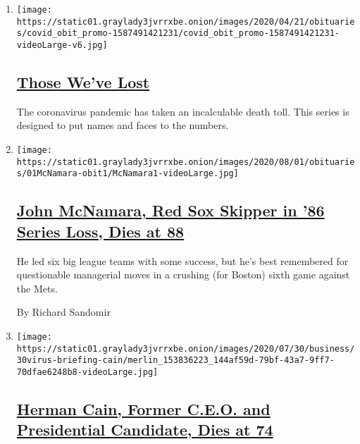\begin{enumerate}
\def\labelenumi{\arabic{enumi}.}
\item
  \texttt{[image: https://static01.graylady3jvrrxbe.onion/images/2020/04/21/obituaries/covid\_obit\_promo-1587491421231/covid\_obit\_promo-1587491421231-videoLarge-v6.jpg]}

  \hypertarget{those-weve-lost}{%
  \subsection{\texorpdfstring{\href{https://www.nytimes3xbfgragh.onion/interactive/2020/obituaries/people-died-coronavirus-obituaries.html}{Those
  We've Lost}}{Those We've Lost}}\label{those-weve-lost}}

  The coronavirus pandemic has taken an incalculable death toll. This
  series is designed to put names and faces to the numbers.
\item
  \texttt{[image: https://static01.graylady3jvrrxbe.onion/images/2020/08/01/obituaries/01McNamara-obit1/McNamara1-videoLarge.jpg]}

  \hypertarget{john-mcnamara-red-sox-skipper-in-86-series-loss-dies-at-88}{%
  \subsection{\texorpdfstring{\href{/2020/07/31/sports/baseball/john-mcnamara-dead.html}{John
  McNamara, Red Sox Skipper in '86 Series Loss, Dies at
  88}}{John McNamara, Red Sox Skipper in '86 Series Loss, Dies at 88}}\label{john-mcnamara-red-sox-skipper-in-86-series-loss-dies-at-88}}

  He led six big league teams with some success, but he's best
  remembered for questionable managerial moves in a crushing (for
  Boston) sixth game against the Mets.

  By Richard Sandomir
\item
  \texttt{[image: https://static01.graylady3jvrrxbe.onion/images/2020/07/30/business/30virus-briefing-cain/merlin\_153836223\_144af59d-79bf-43a7-9ff7-70dfae6248b8-videoLarge.jpg]}

  \hypertarget{herman-cain-former-ceo-and-presidential-candidate-dies-at-74}{%
  \subsection{\texorpdfstring{\href{/2020/07/30/us/politics/herman-cain-dead.html}{Herman
  Cain, Former C.E.O. and Presidential Candidate, Dies at
  74}}{Herman Cain, Former C.E.O. and Presidential Candidate, Dies at 74}}\label{herman-cain-former-ceo-and-presidential-candidate-dies-at-74}}


\end{enumerate}

